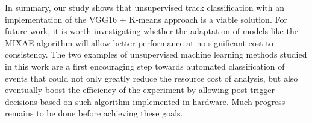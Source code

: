 \documentclass[review,number,sort&compress]{elsarticle}
\begin{document}
In summary, our study shows that unsupervised track classification with an implementation of the VGG16 + K-means approach is a viable solution. For future work, it is worth investigating whether the adaptation of  models like the MIXAE algorithm will allow better performance at no significant cost to consistency.  
The two examples of unsupervised machine learning methods studied in this work are a first encouraging step towards automated classification of events that could not only greatly reduce the resource cost of analysis, but also eventually boost the efficiency of the experiment by allowing post-trigger decisions based on such algorithm implemented in hardware. Much progress remains to be done before achieving these goals.



\end{document}
